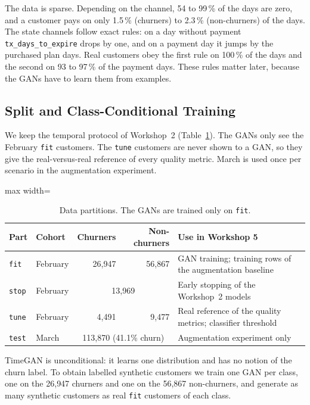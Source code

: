 \documentclass{article}
\begin{document}
The data is sparse. Depending on the channel, 54 to 99\,\% of the days are zero, and a customer pays on only 1.5\,\% (churners) to 2.3\,\% (non-churners) of the days. The state channels follow exact rules: on a day without payment \texttt{tx\_days\_to\_expire} drops by one, and on a payment day it jumps by the purchased plan days. Real customers obey the first rule on 100\,\% of the days and the second on 93 to 97\,\% of the payment days. These rules matter later, because the GANs have to learn them from examples.

\subsection{Split and Class-Conditional Training}

We keep the temporal protocol of Workshop~2 (Table~\ref{tab:w5_split}). The GANs only see the February \texttt{fit} customers. The \texttt{tune} customers are never shown to a GAN, so they give the real-versus-real reference of every quality metric. March is used once per scenario in the augmentation experiment.

\begin{table}[H]
\centering
\renewcommand{\arraystretch}{1.3}
\begin{adjustbox}{max width=\textwidth}
\begin{tabular}{|l|l|r|r|l|}
\hline
\textbf{Part} & \textbf{Cohort} & \textbf{Churners} & \textbf{Non-churners} & \textbf{Use in Workshop 5} \\ \hline
\texttt{fit}  & February & 26{,}947 & 56{,}867 & GAN training; training rows of the augmentation baseline \\ \hline
\texttt{stop} & February & \multicolumn{2}{c|}{13{,}969} & Early stopping of the Workshop~2 models \\ \hline
\texttt{tune} & February & 4{,}491 & 9{,}477 & Real reference of the quality metrics; classifier threshold \\ \hline
\texttt{test} & March    & \multicolumn{2}{c|}{113{,}870 (41.1\% churn)} & Augmentation experiment only \\ \hline
\end{tabular}
\end{adjustbox}
\caption{Data partitions. The GANs are trained only on \texttt{fit}.}
\label{tab:w5_split}
\end{table}

TimeGAN is unconditional: it learns one distribution and has no notion of the churn label. To obtain labelled synthetic customers we train one GAN per class, one on the 26{,}947 churners and one on the 56{,}867 non-churners, and generate as many synthetic customers as real \texttt{fit} customers of each class.
\end{document}
